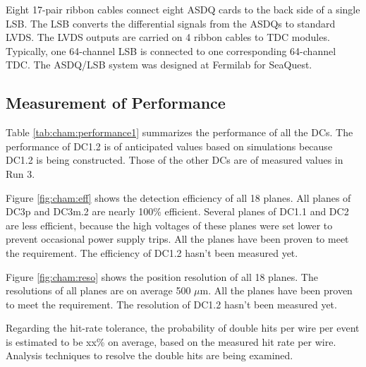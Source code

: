 Eight 17-pair ribbon cables connect eight ASDQ cards to the back side of a single LSB.  The LSB converts the differential signals from the ASDQs to standard LVDS.  The LVDS outputs are carried on 4 ribbon cables to TDC modules.  Typically, one 64-channel LSB is connected to one corresponding 64-channel TDC. The ASDQ/LSB system was designed at Fermilab for SeaQuest.
\subsection{Measurement of Performance}

Table \ref{tab:cham:performance1} summarizes the performance of all the DCs.
The performance of DC1.2 is of anticipated values based on simulations
because DC1.2 is being constructed.
Those of the other DCs are of measured values in Run 3.

Figure \ref{fig:cham:eff} shows the detection efficiency of all 18 planes.
All planes of DC3p and DC3m.2 are nearly 100\% efficient.
Several planes of DC1.1 and DC2 are less efficient,
because the high voltages of these planes were set lower
to prevent occasional power supply trips.
All the planes have been proven to meet the requirement.
The efficiency of DC1.2 hasn't been measured yet.

Figure \ref{fig:cham:reso} shows the position resolution of all 18 planes.
The resolutions of all planes are on average 500 $\mu$m.
All the planes have been proven to meet the requirement.
The resolution of DC1.2 hasn't been measured yet.

Regarding the hit-rate tolerance,
the probability of double hits per wire per event is estimated to be xx\% on average,
based on the measured hit rate per wire.
Analysis techniques to resolve the double hits are being examined.

